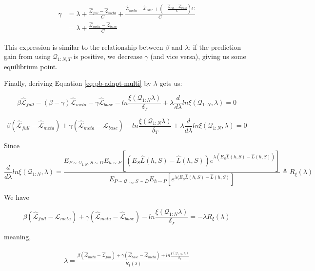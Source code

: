 \documentclass[letterpaper]{article}
\theoremstyle{definition}
\begin{document}
\begin{align} 
\begin{split}
\gamma &= \lambda+\frac{\hat{\mathcal{L}}_{full}-\hat{\mathcal{L}}_{meta} }{C}+\frac{\hat{\mathcal{L}}_{meta}-\hat{\mathcal{L}}_{base}+(-\frac{\hat{\mathcal{L}}_{full}-\hat{\mathcal{L}}_{meta}}{C})C}{C}\\
&=\lambda+\frac{\hat{\mathcal{L}}_{meta}-\hat{\mathcal{L}}_{base}}{C}
\end{split}
\end{align}

This expression is similar to the relationship between $\beta$ and $\lambda$: if the prediction gain from using $\mathcal{Q}_{1:N,T}$ is positive, we decrease $\gamma$ (and vice versa), giving us some equilibrium point.

Finally, deriving Equation \ref{eq:pb-adapt-multi} by $\lambda$ gets us:

$$\beta \hat{\mathcal{L}}_{full}-(\beta-\gamma)\hat{\mathcal{L}}_{meta}-\gamma\hat{\mathcal{L}}_{base}-ln\frac{\xi(\mathcal{Q}_{1:N}\lambda)}{\delta_T}+\lambda\frac{d}{d\lambda}ln\xi(\mathcal{Q}_{1:N},\lambda)=0$$

$$\beta(\hat{\mathcal{L}}_{full}-\hat{\mathcal{L}}_{meta})+\gamma(\hat{\mathcal{L}}_{meta}-\hat{\mathcal{L}}_{base})-ln\frac{\xi(\mathcal{Q}_{1:N}\lambda)}{\delta_T}+\lambda\frac{d}{d\lambda}ln\xi(\mathcal{Q}_{1:N},\lambda)=0$$

Since $$\frac{d}{d\lambda}ln\xi(\mathcal{Q}_{1:N},\lambda)=\frac{E_{P\sim \mathcal{Q}_{1:N},S\sim D}E_{h\sim P}\left [(E_S\hat{L}(h, S)-\hat{L}(h, S))e^{\lambda(E_S\hat{L}(h, S)-\hat{L}(h, S))} \right ]}{E_{P\sim \mathcal{Q}_{1:N},S\sim D}E_{h\sim P}\left [e^{\lambda(E_S\hat{L}(h, S)-\hat{L}(h, S)} \right ]}\triangleq R_\xi(\lambda)$$

We have

$$\beta(\hat{\mathcal{L}}_{full}-\hat{\mathcal{L}}_{meta})+\gamma(\hat{\mathcal{L}}_{meta}-\hat{\mathcal{L}}_{base})-ln\frac{\xi(\mathcal{Q}_{1:N}\lambda)}{\delta_T}=-\lambda R_\xi(\lambda)$$

meaning,

\begin{align} 
\begin{split}
\lambda = \frac{\beta(\hat{\mathcal{L}}_{meta}-\hat{\mathcal{L}}_{full})+\gamma(\hat{\mathcal{L}}_{base}-\hat{\mathcal{L}}_{meta})+ln\frac{\xi(\mathcal{Q}_{1:N},\lambda)}{\delta_T}}{R_\xi(\lambda)}
\end{split}
\end{align}
\end{document}
